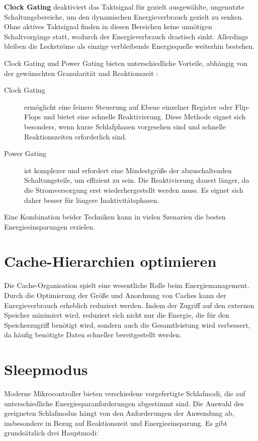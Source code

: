 \documentclass[footmark=none]{tubaf-thesis}
\begin{document}
			\textbf{Clock Gating} deaktiviert das Taktsignal für gezielt ausgewählte, ungenutzte Schaltungsbereiche, um den dynamischen Energieverbrauch gezielt zu senken. Ohne aktives Taktsignal finden in diesen Bereichen keine unnötigen Schaltvorgänge statt, wodurch der Energieverbrauch drastisch sinkt. Allerdings bleiben die Leckströme als einzige verbleibende Energiequelle weiterhin bestehen. \cite{1198683}
		
			Clock Gating und Power Gating bieten unterschiedliche Vorteile, abhängig von der gewünschten Granularität und Reaktionszeit \cite{1198683} \cite{F2}:
			
			\begin{description}
				\item[Clock Gating] ermöglicht eine feinere Steuerung auf Ebene einzelner Register oder Flip-Flops und bietet eine schnelle Reaktivierung. Diese Methode eignet sich besonders, wenn kurze Schlafphasen vorgesehen sind und schnelle Reaktionszeiten erforderlich sind.
				\item[Power Gating] \sloppy ist komplexer und erfordert eine Mindestgröße der abzuschaltenden Schaltungsteile, um effizient zu sein. Die Reaktivierung dauert länger, da die Stromversorgung erst wiederhergestellt werden muss. Es eignet sich daher besser für längere Inaktivitätsphasen.
			\end{description}
			
			Eine Kombination beider Techniken kann in vielen Szenarien die besten Energieeinsparungen erzielen.
		
		\section{Cache-Hierarchien optimieren}
			Die Cache-Organisation spielt eine wesentliche Rolle beim Energiemanagement. Durch die Optimierung der Größe und Anordnung von Caches kann der Energieverbrauch erheblich reduziert werden. Indem der Zugriff auf den externen Speicher minimiert wird, reduziert sich nicht nur die Energie, die für den Speicherzugriff benötigt wird, sondern auch die Gesamtleistung wird verbessert, da häufig benötigte Daten schneller bereitgestellt werden. \cite{F1}
		
		\section{Sleepmodus}
			Moderne Mikrocontroller bieten verschiedene vorgefertigte Schlafmodi, die auf unterschiedliche Energiesparanforderungen abgestimmt sind. Die Auswahl des geeigneten Schlafmodus hängt von den Anforderungen der Anwendung ab, insbesondere in Bezug auf Reaktionszeit und Energieeinsparung. Es gibt grundsätzlich drei Hauptmodi:
		
\end{document}
